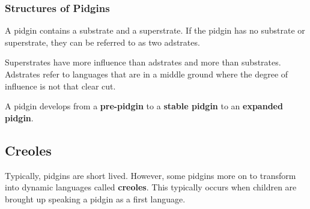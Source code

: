 \documentclass[../main.tex]{subfiles}
\begin{document}
    \subsubsection{Structures of Pidgins}
    A pidgin contains a substrate and a superstrate. If the pidgin has no substrate or superstrate, they can be referred to as two adstrates. \par
    Superstrates have more influence than adstrates and more than substrates. Adstrates refer to languages that are in a middle ground where the degree of influence is not that clear cut. \par
    A pidgin develops from a \textbf{pre-pidgin} to a \textbf{stable pidgin} to an \textbf{expanded pidgin}.

    \subsection{Creoles}
    Typically, pidgins are short lived. However, some pidgins more on to transform into dynamic languages called \textbf{creoles}. This typically occurs when children are brought up speaking a pidgin as a first language.
\end{document}
